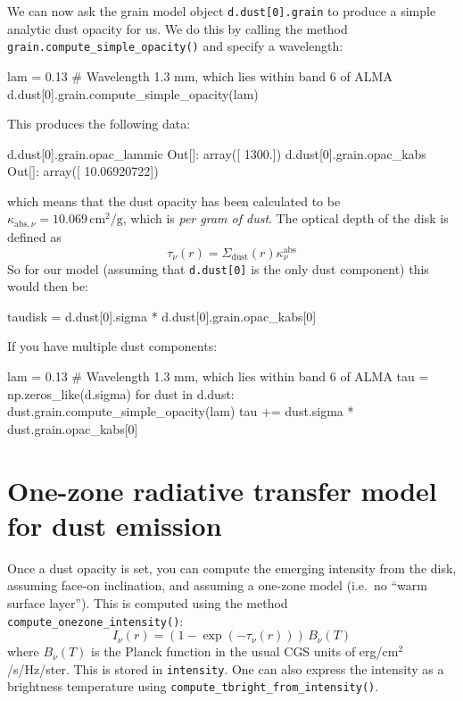 \documentclass{book}
\newcommand{\code}[1]{{\small\tt #1}}
\begin{document}
We can now ask the grain model object \code{d.dust[0].grain} to produce a simple
analytic dust opacity for us.
We do this by calling the method \code{grain.compute\_simple\_opacity()} and
specify a wavelength:
\begin{codebox}
lam = 0.13     # Wavelength 1.3 mm, which lies within band 6 of ALMA
d.dust[0].grain.compute_simple_opacity(lam)
\end{codebox}
This produces the following data:
\begin{codebox}
d.dust[0].grain.opac_lammic
Out[]: array([ 1300.])
d.dust[0].grain.opac_kabs
Out[]: array([ 10.06920722])
\end{codebox}
which means that the dust opacity has been calculated to be
$\kappa_{\mathrm{abs},\nu}=10.069\,\mathrm{cm}^2/\mathrm{g}$, which is {\em per gram
  of dust}. The optical depth of the disk is defined as
\begin{equation}
  \tau_\nu(r) = \Sigma_{\mathrm{dust}}(r) \kappa_\nu^{\mathrm{abs}}
\end{equation}
So for our model (assuming that \code{d.dust[0]} is the only
dust component) this would then be:
\begin{codebox}
taudisk = d.dust[0].sigma * d.dust[0].grain.opac_kabs[0]
\end{codebox}
If you have multiple dust components:
\begin{codebox}
lam = 0.13     # Wavelength 1.3 mm, which lies within band 6 of ALMA
tau = np.zeros_like(d.sigma)
for dust in d.dust:
   dust.grain.compute_simple_opacity(lam)
   tau += dust.sigma * dust.grain.opac_kabs[0]
\end{codebox}

\section{One-zone radiative transfer model for dust emission}
\label{sec-simple-radtrans}
Once a dust opacity is set, you can compute the emerging intensity from the disk,
assuming face-on inclination, and assuming a one-zone model (i.e.\ no ``warm
surface layer''). This is computed using the method\\ \code{compute\_onezone\_intensity()}:
\begin{equation}
I_\nu(r) = \left(1-\exp(-\tau_\nu(r))\right)\,B_\nu(T)
\end{equation}
where $B_\nu(T)$ is the Planck function in the usual CGS units of
erg/cm$^2$/s/Hz/ster.  This is stored in \code{intensity}. One can also express
the intensity as a brightness temperature using
\code{compute\_tbright\_from\_intensity()}.
\end{document}
